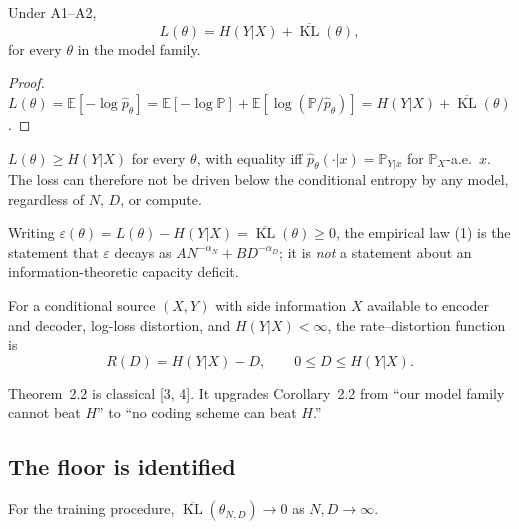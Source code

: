 \documentclass[entropy,article,submit,moreauthors,pdftex]{mdpi}
\newcommand{\eps}{\varepsilon}
\newcommand{\KL}{\operatorname{KL}}
\newcommand{\E}{\mathbb{E}}
\newcommand{\Prob}{\mathbb{P}}
\begin{document}
\begin{theorem}
\label{thm:decomp}
Under A1--A2,
\begin{equation}
  L(\theta) = H(Y|X) + \overline{\KL}(\theta),
  \label{eq:decomp}
\end{equation}
for every $\theta$ in the model family.
\end{theorem}

\begin{proof}
$L(\theta)=\E[-\log\hat p_\theta]=\E[-\log\Prob]+\E[\log(\Prob/\hat
p_\theta)]=H(Y|X)+\overline{\KL}(\theta)$.
\end{proof}

\begin{corollary}
\label{cor:floor}
$L(\theta)\ge H(Y|X)$ for every $\theta$, with equality iff
$\hat p_\theta(\cdot|x)=\Prob_{Y|x}$ for $\Prob_X$-a.e.\ $x$. The loss can
therefore not be driven below the conditional entropy by any model, regardless
of $N$, $D$, or compute.
\end{corollary}

\begin{corollary}[Reframing]
\label{cor:excess}
Writing $\eps(\theta)=L(\theta)-H(Y|X)=\overline{\KL}(\theta)\ge0$, the
empirical law (1) is the statement that $\eps$ decays as
$A N^{-\alpha_N}+B D^{-\alpha_D}$; it is \emph{not} a statement about
an information-theoretic capacity deficit.
\end{corollary}

\begin{theorem}
\label{thm:rd}
For a conditional source $(X,Y)$ with side information $X$ available to encoder
and decoder, log-loss distortion, and $H(Y|X)<\infty$, the rate--distortion
function is
\begin{equation}
  R(D)=H(Y|X)-D,\qquad 0\le D\le H(Y|X).
  \label{eq:rd}
\end{equation}
\end{theorem}
\begin{remark}
Theorem~2.2 is classical [3, 4]. It upgrades
Corollary~2.2 from ``our model family cannot beat $H$'' to
``no coding scheme can beat $H$.''
\end{remark}

\subsection{The floor is identified}
\begin{assumption}
\label{ass:consistent}
For the training procedure, $\overline{\KL}(\theta_{N,D})\to0$ as
$N,D\to\infty$.
\end{assumption}
\end{document}
